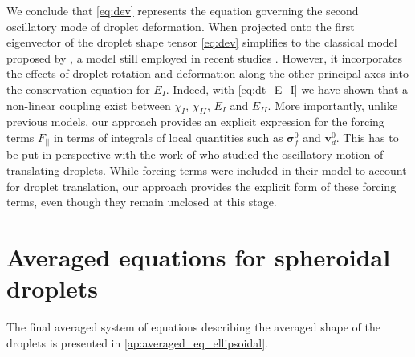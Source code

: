 We conclude that \ref{eq:dev} represents the equation governing the second oscillatory mode of droplet deformation. 
When projected onto the first eigenvector of the droplet shape tensor \ref{eq:dev} simplifies to the classical model proposed by \citet{lamb1924hydrodynamics}, a model still employed in recent studies \citep{riviere2021sub}. 
However, it incorporates the effects of droplet rotation and deformation along the other principal axes into the conservation equation for $E_I$. 
Indeed, with \ref{eq:dt_E_I} we have shown that a non-linear coupling exist between $\chi_I$, $\chi_{II}$, $E_I$ and $E_{II}$. 
More importantly, unlike previous models, our approach provides an explicit expression for the forcing terms $F_{||}$ in terms of integrals of local quantities such as $\bm\sigma_f^0$ and $\textbf{v}_d^0$.
This has to be put in perspective with the work of \citet{lalanne2013effect} who studied the oscillatory motion of translating droplets. 
While forcing terms were included in their model to account for droplet translation, our approach provides the explicit form of these forcing terms, even though they remain unclosed at this stage.



\section{Averaged equations for spheroidal droplets}

The final averaged system of equations describing the averaged shape of the droplets is presented in \ref{ap:averaged_eq_ellipsoidal}. 

